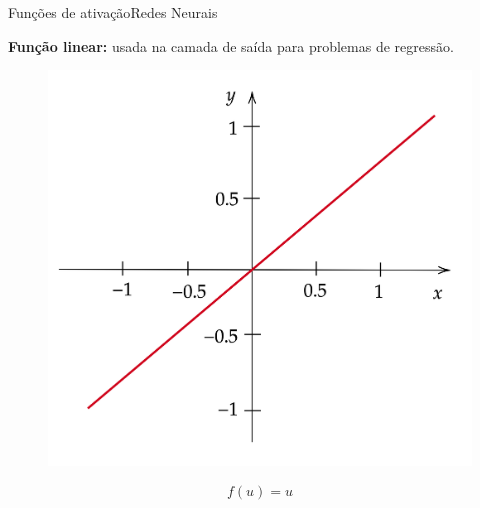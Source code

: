 \documentclass[t]{beamer}
\begin{document}
\begin{ftst}{Funções de ativação}{Redes Neurais}

\textbf{Função linear:} usada na camada de saída para problemas de regressão.
\begin{figure}[!htb]
    \centering
    \begin{minipage}{.5\textwidth}
        \centering
        \includegraphics[scale=0.1]{Figuras/linear.png}
        \label{fig:prob1_6_2}
    \end{minipage}%
    \begin{minipage}{0.5\textwidth}
        \centering
        \begin{equation}
            f(u) = u
        \end{equation}
         \left [ -\infty, +\infty  \right ]
    \end{minipage}
\end{figure}
\end{ftst}

\end{document}
